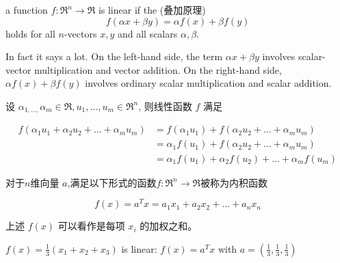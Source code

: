 \begin{theorem}
        a function $ f: \mathfrak{R}^{n} \rightarrow \mathfrak{R} $ is linear if the  (叠加原理)
    \begin{equation}
    f(\alpha x+\beta y)=\alpha f(x)+\beta f(y)
    \end{equation}
    holds for all $ n $-vectors $ x, y $ and all scalars $ \alpha, \beta $.
    
\end{theorem}

In fact it says a lot. On the left-hand side, the term $ \alpha x+\beta y $ involves scalar-vector multiplication and vector addition. On the right-hand side, $ \alpha f(x)+\beta f(y) $ involves ordinary scalar multiplication and scalar addition.

\begin{corollary}
    设 $ \alpha_{1, \ldots,} \alpha_{m} \in \mathfrak{R}, u_{1}, \ldots, u_{m} \in \mathfrak{R}^{n} $, 则线性函数 $ f $ 满足

    \begin{equation} \begin{aligned} f\left(\alpha_{1} u_{1}+\alpha_{2} u_{2}+\ldots+\alpha_{m} u_{m}\right) &=f\left(\alpha_{1} u_{1}\right)+f\left(\alpha_{2} u_{2}+\ldots+\alpha_{m} u_{m}\right) \\ &=\alpha_{1} f\left(u_{1}\right)+f\left(\alpha_{2} u_{2}+\ldots+\alpha_{m} u_{m}\right) \\ &=\alpha_{1} f\left(u_{1}\right)+\alpha_{2} f\left(u_{2}\right)+\ldots+\alpha_{m} f\left(u_{m}\right) \end{aligned} \end{equation}
\end{corollary}

\begin{definition}
    对于$n$维向量 $ a $,满足以下形式的函数$ f: \mathfrak{R}^{n} \rightarrow \mathfrak{R} $被称为内积函数

    \begin{equation} f(x)=a^{T} x=a_{1} x_{1}+a_{2} x_{2}+\ldots+a_{n} x_{n} \end{equation}
\end{definition}

上述 $ f(x) $ 可以看作是每项 $ x_{{i}} $ 的加权之和。 

\begin{example}
    $ f(x)=\frac{1}{3}\left(x_{1}+x_{2}+x_{3}\right) $ is linear: $ f(x)=a^{T} x $ with $ a=\left(\frac{1}{3}, \frac{1}{3}, \frac{1}{3}\right) $
\end{example}

